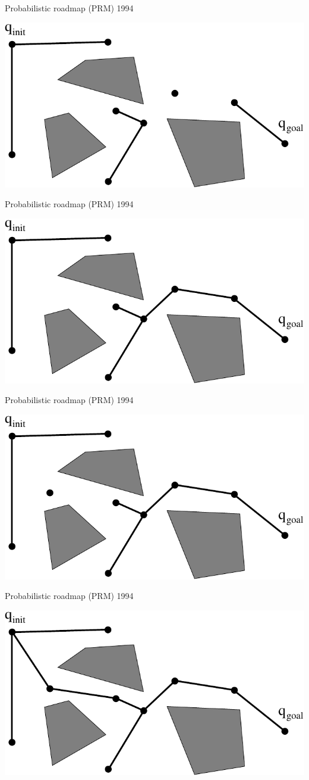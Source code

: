\begin{frame} {Probabilistic roadmap (PRM) 1994}
\centerline {
  \includegraphics[width=.8\linewidth]{figures/PRM15.pdf}
}
\end{frame}

\begin{frame} {Probabilistic roadmap (PRM) 1994}
\centerline {
  \includegraphics[width=.8\linewidth]{figures/PRM16.pdf}
}
\end{frame}

\begin{frame} {Probabilistic roadmap (PRM) 1994}
\centerline {
  \includegraphics[width=.8\linewidth]{figures/PRM17.pdf}
}
\end{frame}

\begin{frame} {Probabilistic roadmap (PRM) 1994}
\centerline {
  \includegraphics[width=.8\linewidth]{figures/PRM18.pdf}
}
\end{frame}

